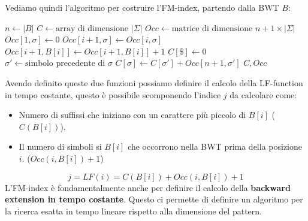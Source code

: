 Vediamo quindi l'algoritmo per costruire l'FM-index, partendo dalla BWT $B$:
\begin{algorithm}
    \begin{algorithmic}
        \State $n \gets |B|$
        \State $C \gets \text{array di dimensione } |\Sigma|$
        \State $Occ \gets \text{matrice di dimensione } n + 1 \times |\Sigma|$
        \For{$\sigma \in \Sigma$}
        \State $Occ[1, \sigma] \gets 0$
        \EndFor
        \State $Occ[i + 1, \sigma] \gets Occ[i, \sigma]$
        \EndFor
        \State $Occ[i + 1, B[i]] \gets Occ[i + 1, B[i]] + 1$
        \EndFor
        \State $C[\$] \gets 0$
        \State $\sigma' \gets \text{simbolo precedente di } \sigma$
        \State $C[\sigma] \gets C[\sigma'] + Occ[n + 1, \sigma']$
        \EndFor
        \State \Return $C, Occ$
        \EndFunction
    \end{algorithmic}
\end{algorithm}
\newpage
Avendo definito queste due funzioni possiamo definire il calcolo della LF-function
in tempo costante, questo è possibile scomponendo l'indice $j$ da calcolare come:
\begin{itemize}
    \item Numero di suffissi che iniziano con un carattere più piccolo di $B[i]$
          ($C(B[i])$).
    \item Il numero di simboli si $B[i]$ che occorrono nella BWT prima della
          posizione $i$. ($Occ(i, B[i]) + 1$)
\end{itemize}
\begin{equation}
    j = LF(i) = C(B[i]) + Occ(i, B[i]) + 1
\end{equation}
L'FM-index è fondamentalmente anche per definire il calcolo della \textbf{backward
    extension in tempo costante}. Questo ci permette di definire un algoritmo
per la ricerca esatta in tempo lineare rispetto alla dimensione del pattern.

